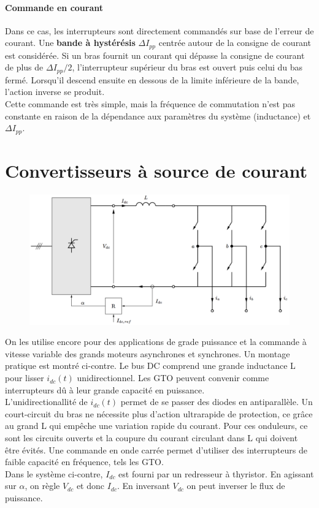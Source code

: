 	\paragraph{Commande en courant}\quad Dans ce cas, les interrupteurs sont directement commandés sur base de l'erreur de courant. Une \textbf{bande à hystérésis} $\Delta I_{pp}$ centrée autour de la consigne de courant est considérée. Si un bras fournit un courant qui dépasse la consigne de courant de plus de $\Delta I_{pp}/2$, l'interrupteur supérieur du bras est ouvert puis celui du bas fermé. Lorsqu'il descend ensuite en dessous de la limite inférieure de la bande, l'action inverse se produit. \\
	
	Cette commande est très simple, mais la fréquence de commutation n'est pas constante en raison de la dépendance aux paramètres du système (inductance) et $\Delta I_{pp}$. 
	
\section{Convertisseurs à source de courant}
	\begin{figure}
		\vspace{-5mm}
		\includegraphics[scale=0.25]{ch4/33}
		\end{figure}
	On les utilise encore pour des applications de grade puissance et la commande à vitesse variable des grands moteurs asynchrones et synchrones. Un montage pratique est montré ci-contre. Le bus DC comprend une grande inductance L pour lisser $i_{dc}(t)$ unidirectionnel. Les GTO peuvent convenir comme interrupteurs dû à leur grande capacité en puissance. \\
	
	L'unidirectionallité de $i_{dc}(t)$ permet de se passer des diodes en antiparallèle. Un court-circuit du bras ne nécessite plus d'action ultrarapide de protection, ce grâce au grand L qui empêche une variation rapide du courant. Pour ces onduleurs, ce sont les circuits ouverts et la coupure du courant circulant dans L qui doivent être évités. Une commande en onde carrée permet d'utiliser des interrupteurs de faible capacité en fréquence, tels les GTO. \\
	
	Dans le système ci-contre, $I_{dc}$ est fourni par un redresseur à thyristor. En agissant sur $\alpha$, on règle $V_{dc}$ et donc $I_{dc}$. En inversant $V_{dc}$ on peut inverser le flux de puissance.
